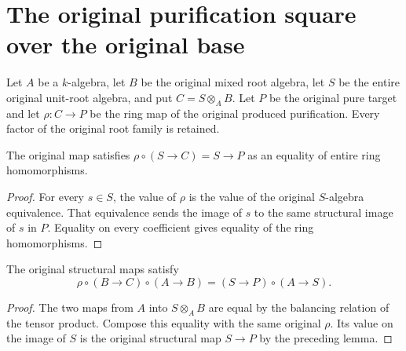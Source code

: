 \section{The original purification square over the original base}

Let $A$ be a $k$-algebra, let $B$ be the original mixed root algebra,
let $S$ be the entire original unit-root algebra, and put
$C=S\otimes_A B$.  Let $P$ be the original pure target and let
$\rho:C\to P$ be the ring map of the original produced purification.
Every factor of the original root family is retained.

\begin{lemma}
\label{lem:kn-mixed-purification-original-unit-coefficients}
\leanok
The original map satisfies
$\rho\circ(S\to C)=S\to P$ as an equality of entire ring homomorphisms.
\end{lemma}
\begin{proof}
For every $s\in S$, the value of $\rho$ is the value of the original
$S$-algebra equivalence.  That equivalence sends the image of $s$ to
the same structural image of $s$ in $P$.  Equality on every coefficient
gives equality of the ring homomorphisms.
\end{proof}

\begin{lemma}
\label{lem:kn-mixed-purification-original-ring-square}
\leanok
The original structural maps satisfy
\[
 \rho\circ(B\to C)\circ(A\to B)=(S\to P)\circ(A\to S).
\]
\end{lemma}
\begin{proof}
The two maps from $A$ into $S\otimes_A B$ are equal by the balancing
relation of the tensor product.  Compose this equality with the same
original $\rho$.  Its value on the image of $S$ is the original
structural map $S\to P$ by the preceding lemma.
\end{proof}

